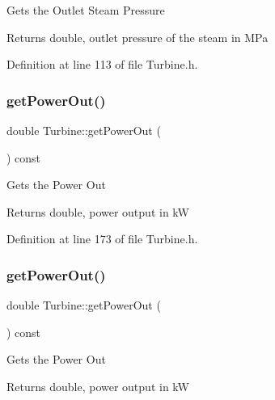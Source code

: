 Gets the Outlet Steam Pressure

\begin{DoxyReturn}{Returns}
double, outlet pressure of the steam in M\+Pa 
\end{DoxyReturn}


Definition at line 113 of file Turbine.\+h.

\mbox{\label{class_turbine_a89585cc2fbfdbe67d539eae08c369fa2}} 
\subsubsection{\texorpdfstring{get\+Power\+Out()}{getPowerOut()}\hspace{0.1cm}{\footnotesize\ttfamily [1/3]}}
{\footnotesize\ttfamily double Turbine\+::get\+Power\+Out (\begin{DoxyParamCaption}{ }\end{DoxyParamCaption}) const\hspace{0.3cm}{\ttfamily [inline]}}

Gets the Power Out

\begin{DoxyReturn}{Returns}
double, power output in kW 
\end{DoxyReturn}


Definition at line 173 of file Turbine.\+h.

\mbox{\label{class_turbine_a89585cc2fbfdbe67d539eae08c369fa2}} 
\subsubsection{\texorpdfstring{get\+Power\+Out()}{getPowerOut()}\hspace{0.1cm}{\footnotesize\ttfamily [2/3]}}
{\footnotesize\ttfamily double Turbine\+::get\+Power\+Out (\begin{DoxyParamCaption}{ }\end{DoxyParamCaption}) const\hspace{0.3cm}{\ttfamily [inline]}}

Gets the Power Out

\begin{DoxyReturn}{Returns}
double, power output in kW 
\end{DoxyReturn}


